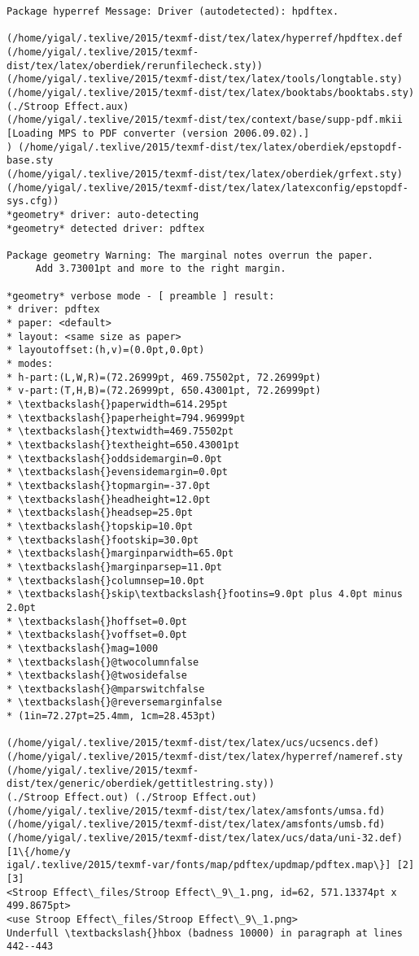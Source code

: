 \documentclass{article}
\begin{document}
\begin{Verbatim}[commandchars=\\\{\}]
Package hyperref Message: Driver (autodetected): hpdftex.

(/home/yigal/.texlive/2015/texmf-dist/tex/latex/hyperref/hpdftex.def
(/home/yigal/.texlive/2015/texmf-dist/tex/latex/oberdiek/rerunfilecheck.sty))
(/home/yigal/.texlive/2015/texmf-dist/tex/latex/tools/longtable.sty)
(/home/yigal/.texlive/2015/texmf-dist/tex/latex/booktabs/booktabs.sty)
(./Stroop Effect.aux)
(/home/yigal/.texlive/2015/texmf-dist/tex/context/base/supp-pdf.mkii
[Loading MPS to PDF converter (version 2006.09.02).]
) (/home/yigal/.texlive/2015/texmf-dist/tex/latex/oberdiek/epstopdf-base.sty
(/home/yigal/.texlive/2015/texmf-dist/tex/latex/oberdiek/grfext.sty)
(/home/yigal/.texlive/2015/texmf-dist/tex/latex/latexconfig/epstopdf-sys.cfg))
*geometry* driver: auto-detecting
*geometry* detected driver: pdftex

Package geometry Warning: The marginal notes overrun the paper.
     Add 3.73001pt and more to the right margin.

*geometry* verbose mode - [ preamble ] result:
* driver: pdftex
* paper: <default>
* layout: <same size as paper>
* layoutoffset:(h,v)=(0.0pt,0.0pt)
* modes: 
* h-part:(L,W,R)=(72.26999pt, 469.75502pt, 72.26999pt)
* v-part:(T,H,B)=(72.26999pt, 650.43001pt, 72.26999pt)
* \textbackslash{}paperwidth=614.295pt
* \textbackslash{}paperheight=794.96999pt
* \textbackslash{}textwidth=469.75502pt
* \textbackslash{}textheight=650.43001pt
* \textbackslash{}oddsidemargin=0.0pt
* \textbackslash{}evensidemargin=0.0pt
* \textbackslash{}topmargin=-37.0pt
* \textbackslash{}headheight=12.0pt
* \textbackslash{}headsep=25.0pt
* \textbackslash{}topskip=10.0pt
* \textbackslash{}footskip=30.0pt
* \textbackslash{}marginparwidth=65.0pt
* \textbackslash{}marginparsep=11.0pt
* \textbackslash{}columnsep=10.0pt
* \textbackslash{}skip\textbackslash{}footins=9.0pt plus 4.0pt minus 2.0pt
* \textbackslash{}hoffset=0.0pt
* \textbackslash{}voffset=0.0pt
* \textbackslash{}mag=1000
* \textbackslash{}@twocolumnfalse
* \textbackslash{}@twosidefalse
* \textbackslash{}@mparswitchfalse
* \textbackslash{}@reversemarginfalse
* (1in=72.27pt=25.4mm, 1cm=28.453pt)

(/home/yigal/.texlive/2015/texmf-dist/tex/latex/ucs/ucsencs.def)
(/home/yigal/.texlive/2015/texmf-dist/tex/latex/hyperref/nameref.sty
(/home/yigal/.texlive/2015/texmf-dist/tex/generic/oberdiek/gettitlestring.sty))
(./Stroop Effect.out) (./Stroop Effect.out)
(/home/yigal/.texlive/2015/texmf-dist/tex/latex/amsfonts/umsa.fd)
(/home/yigal/.texlive/2015/texmf-dist/tex/latex/amsfonts/umsb.fd)
(/home/yigal/.texlive/2015/texmf-dist/tex/latex/ucs/data/uni-32.def) [1\{/home/y
igal/.texlive/2015/texmf-var/fonts/map/pdftex/updmap/pdftex.map\}] [2] [3]
<Stroop Effect\_files/Stroop Effect\_9\_1.png, id=62, 571.13374pt x 499.8675pt>
<use Stroop Effect\_files/Stroop Effect\_9\_1.png>
Underfull \textbackslash{}hbox (badness 10000) in paragraph at lines 442--443


\end{Verbatim}
\end{document}
